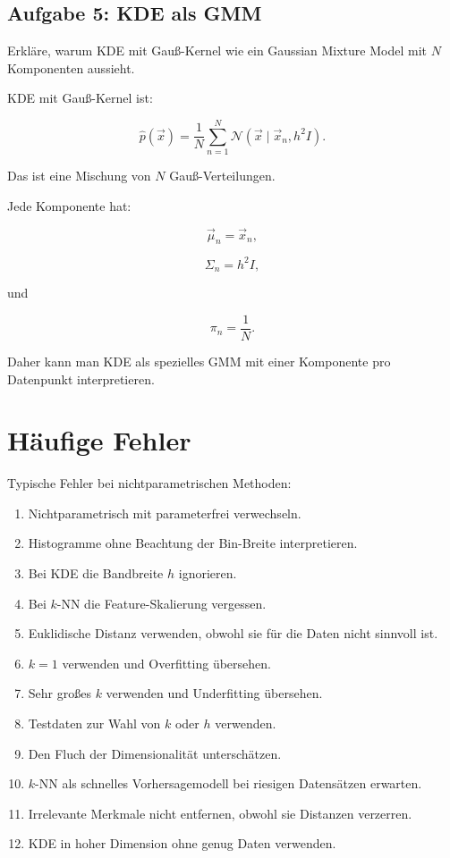 \subsection{Aufgabe 5: KDE als GMM}

Erkläre, warum KDE mit Gauß-Kernel wie ein Gaussian Mixture Model mit \(N\) Komponenten aussieht.

\begin{examplebox}
KDE mit Gauß-Kernel ist:

\[
    \hat{p}(\vec{x})
    =
    \frac{1}{N}
    \sum_{n=1}^{N}
    \mathcal{N}(\vec{x}\mid\vec{x}_n,h^2I).
\]

Das ist eine Mischung von \(N\) Gauß-Verteilungen.

Jede Komponente hat:

\[
    \vec{\mu}_n=\vec{x}_n,
\]

\[
    \Sigma_n=h^2I,
\]

und

\[
    \pi_n=\frac{1}{N}.
\]

Daher kann man KDE als spezielles GMM mit einer Komponente pro Datenpunkt interpretieren.
\end{examplebox}

\section{Häufige Fehler}

\begin{examtipbox}
Typische Fehler bei nichtparametrischen Methoden:

\begin{enumerate}
    \item Nichtparametrisch mit parameterfrei verwechseln.
    \item Histogramme ohne Beachtung der Bin-Breite interpretieren.
    \item Bei KDE die Bandbreite \(h\) ignorieren.
    \item Bei \(k\)-NN die Feature-Skalierung vergessen.
    \item Euklidische Distanz verwenden, obwohl sie für die Daten nicht sinnvoll ist.
    \item \(k=1\) verwenden und Overfitting übersehen.
    \item Sehr großes \(k\) verwenden und Underfitting übersehen.
    \item Testdaten zur Wahl von \(k\) oder \(h\) verwenden.
    \item Den Fluch der Dimensionalität unterschätzen.
    \item \(k\)-NN als schnelles Vorhersagemodell bei riesigen Datensätzen erwarten.
    \item Irrelevante Merkmale nicht entfernen, obwohl sie Distanzen verzerren.
    \item KDE in hoher Dimension ohne genug Daten verwenden.
\end{enumerate}
\end{examtipbox}

